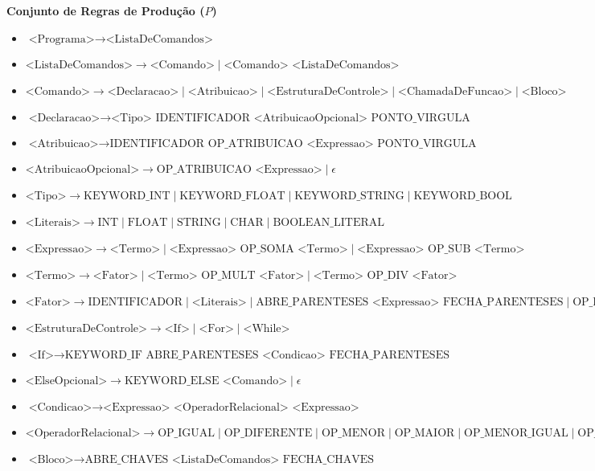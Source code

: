 \documentclass[12pt,a4paper]{article}
\begin{document}
\textbf{Conjunto de Regras de Produção ($P$)}
\vspace{1em}
\begin{itemize}
 \item $\text{<Programa>} \rightarrow \text{<ListaDeComandos>}$
 \item $\text{<ListaDeComandos>} \rightarrow \text{<Comando>} \mid \text{<Comando> <ListaDeComandos>}$
 \item $\text{<Comando>} \rightarrow \text{<Declaracao>} \mid \text{<Atribuicao>} \mid \text{<EstruturaDeControle>} \mid \text{<ChamadaDeFuncao>} \mid \text{<Bloco>}$
 \item $\text{<Declaracao>} \rightarrow \text{<Tipo> IDENTIFICADOR <AtribuicaoOpcional> PONTO\_VIRGULA}$
 \item $\text{<Atribuicao>} \rightarrow \text{IDENTIFICADOR OP\_ATRIBUICAO <Expressao> PONTO\_VIRGULA}$
 \item $\text{<AtribuicaoOpcional>} \rightarrow \text{OP\_ATRIBUICAO <Expressao>} \mid \epsilon$
 \item $\text{<Tipo>} \rightarrow \text{KEYWORD\_INT} \mid \text{KEYWORD\_FLOAT} \mid \text{KEYWORD\_STRING} \mid \text{KEYWORD\_BOOL}$
 \item $\text{<Literais>} \rightarrow \text{INT} \mid \text{FLOAT} \mid \text{STRING} \mid \text{CHAR} \mid \text{BOOLEAN\_LITERAL}$
 \item $\text{<Expressao>} \rightarrow \text{<Termo>} \mid \text{<Expressao> OP\_SOMA <Termo>} \mid \text{<Expressao> OP\_SUB <Termo>}$
 \item $\text{<Termo>} \rightarrow \text{<Fator>} \mid \text{<Termo> OP\_MULT <Fator>} \mid \text{<Termo> OP\_DIV <Fator>}$
 \item $\text{<Fator>} \rightarrow \text{IDENTIFICADOR} \mid \text{<Literais>} \mid \text{ABRE\_PARENTESES <Expressao> FECHA\_PARENTESES} \mid \text{OP\_INC} \mid \text{OP\_DEC}$
 \item $\text{<EstruturaDeControle>} \rightarrow \text{<If>} \mid \text{<For>} \mid \text{<While>}$
 \item $\text{<If>} \rightarrow \text{KEYWORD\_IF ABRE\_PARENTESES <Condicao> FECHA\_PARENTESES <Comando> <ElseOpcional>}$
 \item $\text{<ElseOpcional>} \rightarrow \text{KEYWORD\_ELSE <Comando>} \mid \epsilon$
 \item $\text{<Condicao>} \rightarrow \text{<Expressao> <OperadorRelacional> <Expressao>}$
 \item $\text{<OperadorRelacional>} \rightarrow \text{OP\_IGUAL} \mid \text{OP\_DIFERENTE} \mid \text{OP\_MENOR} \mid \text{OP\_MAIOR} \mid \text{OP\_MENOR\_IGUAL} \mid \text{OP\_MAIOR\_IGUAL}$
 \item $\text{<Bloco>} \rightarrow \text{ABRE\_CHAVES <ListaDeComandos> FECHA\_CHAVES}$
\end{itemize}
\vspace{2em}
\end{document}
